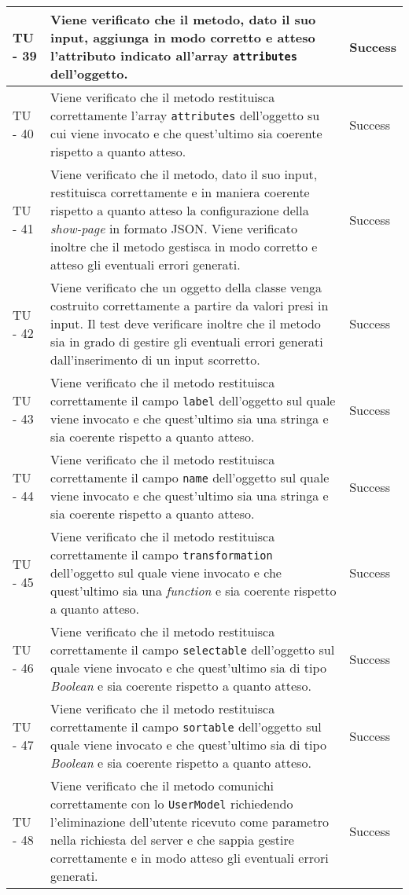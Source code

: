 \begin{center}
\begin{longtable}{ | p{3cm} | p{9cm} | p{2cm} | }
TU - 39 & Viene verificato che il metodo, dato il suo input, aggiunga in modo corretto e atteso l'attributo indicato all'array \texttt{attributes} dell'oggetto. & Success \\ \hline
TU - 40 & Viene verificato che il metodo restituisca correttamente l'array \texttt{attributes} dell'oggetto su cui viene invocato e che quest'ultimo sia coerente rispetto a quanto atteso. & Success \\ \hline
TU - 41 & Viene verificato che il metodo, dato il suo input, restituisca correttamente e in maniera coerente rispetto a quanto atteso la configurazione della \textit{show-page} in formato JSON. Viene verificato inoltre che il metodo gestisca in modo corretto e atteso gli eventuali errori generati. & Success \\ \hline
TU - 42 & Viene verificato che un oggetto della classe venga costruito correttamente a partire da valori presi in input. Il test deve verificare inoltre che il metodo sia in grado di gestire gli eventuali errori generati dall'inserimento di un input scorretto. & Success \\ \hline
TU - 43 & Viene verificato che il metodo restituisca correttamente il campo \texttt{label} dell'oggetto sul quale viene invocato e che quest'ultimo sia una stringa e sia coerente rispetto a quanto atteso. & Success \\ \hline
TU - 44 & Viene verificato che il metodo restituisca correttamente il campo \texttt{name} dell'oggetto sul quale viene invocato e che quest'ultimo sia una stringa e sia coerente rispetto a quanto atteso. & Success \\ \hline
TU - 45 & Viene verificato che il metodo restituisca correttamente il campo \texttt{transformation} dell'oggetto sul quale viene invocato e che quest'ultimo sia una \textit{function} e sia coerente rispetto a quanto atteso. & Success \\ \hline
TU - 46 & Viene verificato che il metodo restituisca correttamente il campo \texttt{selectable} dell'oggetto sul quale viene invocato e che quest'ultimo sia di tipo \textit{Boolean} e sia coerente rispetto a quanto atteso. & Success \\ \hline
TU - 47 & Viene verificato che il metodo restituisca correttamente il campo \texttt{sortable} dell'oggetto sul quale viene invocato e che quest'ultimo sia di tipo \textit{Boolean} e sia coerente rispetto a quanto atteso. & Success \\ \hline
TU - 48 & Viene verificato che il metodo comunichi correttamente con lo \texttt{UserModel} richiedendo l'eliminazione dell'utente ricevuto come parametro nella richiesta del server e che sappia gestire correttamente e in modo atteso gli eventuali errori generati. & Success \\ \hline

\end{longtable}
\end{center}
